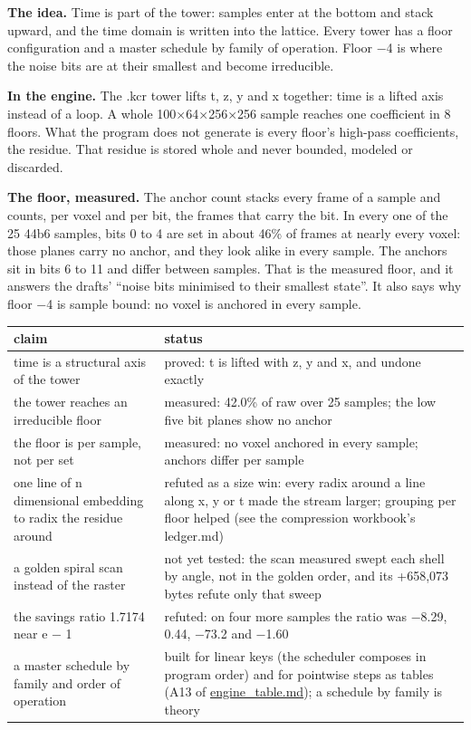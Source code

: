 \textbf{The idea.} Time is part of the tower: samples enter at the bottom and stack upward, and the time domain is written into the lattice. Every tower has a floor configuration and a master schedule by family of operation. Floor −4 is where the noise bits are at their smallest and become irreducible.

\textbf{In the engine.} The .kcr tower lifts t, z, y and x together: time is a lifted axis instead of a loop. A whole 100×64×256×256 sample reaches one coefficient in 8 floors. What the program does not generate is every floor's high-pass coefficients, the residue. That residue is stored whole and never bounded, modeled or discarded.

\textbf{The floor, measured.} The anchor count stacks every frame of a sample and counts, per voxel and per bit, the frames that carry the bit. In every one of the 25 44b6 samples, bits 0 to 4 are set in about 46\% of frames at nearly every voxel: those planes carry no anchor, and they look alike in every sample. The anchors sit in bits 6 to 11 and differ between samples. That is the measured floor, and it answers the drafts' “noise bits minimised to their smallest state”. It also says why floor −4 is sample bound: no voxel is anchored in every sample.

{\small
\setlength{\tabcolsep}{6pt}
\begin{longtable}{>{\RaggedRight\arraybackslash}p{}>{\RaggedRight\arraybackslash}p{}}
\toprule
claim & status \\
\midrule
\endhead
time is a structural axis of the tower & proved: t is lifted with z, y and x, and undone exactly \\
the tower reaches an irreducible floor & measured: 42.0\% of raw over 25 samples; the low five bit planes show no anchor \\
the floor is per sample, not per set & measured: no voxel anchored in every sample; anchors differ per sample \\
one line of n dimensional embedding to radix the residue around & refuted as a size win: every radix around a line along x, y or t made the stream larger; grouping per floor helped (see the compression workbook's ledger.md) \\
a golden spiral scan instead of the raster & not yet tested: the scan measured swept each shell by angle, not in the golden order, and its +658,073 bytes refute only that sweep \\
the savings ratio 1.7174 near e − 1 & refuted: on four more samples the ratio was −8.29, 0.44, −73.2 and −1.60 \\
a master schedule by family and order of operation & built for linear keys (the scheduler composes in program order) and for pointwise steps as tables (A13 of \hyperref[chap:engine-table]{engine\_\allowbreak{}table.md}); a schedule by family is theory \\
\bottomrule
\end{longtable}
}

